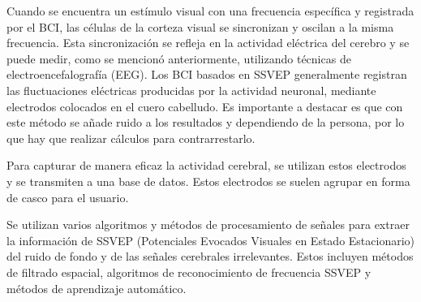 Cuando se encuentra un estímulo visual con una frecuencia específica y registrada por el BCI, las células de la corteza visual se sincronizan y oscilan a la misma frecuencia. Esta sincronización se refleja en la actividad eléctrica del cerebro y se puede medir, como se mencionó anteriormente, utilizando técnicas de electroencefalografía (EEG).
Los BCI basados en SSVEP generalmente registran las fluctuaciones eléctricas producidas por la actividad neuronal, mediante electrodos colocados en el cuero cabelludo. Es importante a destacar es que con este método se añade ruido a los resultados y dependiendo de la persona, por lo que hay que realizar cálculos para contrarrestarlo.




Para capturar de manera eficaz la actividad cerebral, se utilizan estos electrodos y se transmiten a una base de datos. Estos electrodos se suelen agrupar en forma de casco para el usuario. 



Se utilizan varios algoritmos y métodos de procesamiento de señales para extraer la información de SSVEP (Potenciales Evocados Visuales en Estado Estacionario) del ruido de fondo y de las señales cerebrales irrelevantes. Estos incluyen métodos de filtrado espacial, algoritmos de reconocimiento de frecuencia SSVEP y métodos de aprendizaje automático.
